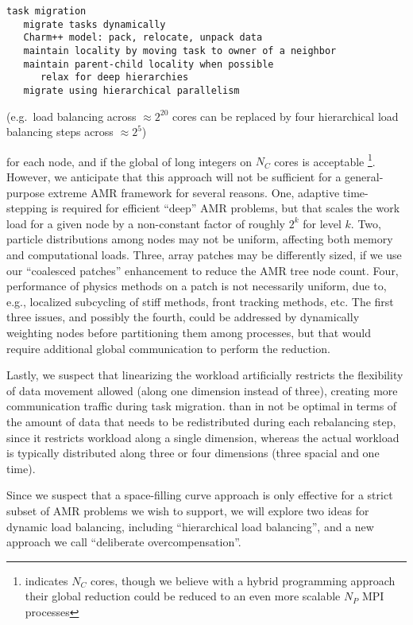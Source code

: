\documentclass{article}
\begin{document}
\begin{verbatim}
task migration
   migrate tasks dynamically
   Charm++ model: pack, relocate, unpack data
   maintain locality by moving task to owner of a neighbor
   maintain parent-child locality when possible
      relax for deep hierarchies
   migrate using hierarchical parallelism
\end{verbatim}

(e.g.~load balancing
across $\approx 2^20$ cores can be replaced by four hierarchical
load balancing steps across $\approx 2^5$)


for each node, and if the global  of long
integers on $N_C$ cores is acceptable \footnote{\cite{BuGh08}
  indicates $N_C$ cores, though we believe with a hybrid programming
  approach their global reduction could be reduced to an even more
  scalable $N_P$ MPI processes}.  However, we anticipate that this
approach will not be sufficient for a general-purpose extreme AMR
framework for several reasons.
%
One, adaptive time-stepping is required for efficient ``deep'' AMR
problems, but that scales the work load for a given node by a
non-constant factor of roughly $2^k$ for level $k$.
%
Two, particle distributions among nodes may not be uniform, affecting both memory and computational loads.
%
Three, array patches may be differently sized, if we use our ``coalesced patches'' enhancement to reduce the AMR tree node count.  
%
Four, performance of physics methods on a patch is not necessarily
uniform, due to, e.g., localized subcycling of stiff methods, front
tracking methods, etc.  The first three issues, and possibly the
fourth, could be addressed by dynamically weighting nodes before
partitioning them among processes, but that would require additional
global communication to perform the reduction.
%

Lastly, we suspect that linearizing the workload artificially
restricts the flexibility of data movement allowed (along one
dimension instead of three), creating more communication traffic
during task migration.  than in not be optimal in terms of the amount
of data that needs to be redistributed during each rebalancing step,
since it restricts workload along a single dimension, whereas the
actual workload is typically distributed along three or four
dimensions (three spacial and one time).

Since we suspect that a space-filling curve approach is only effective
for a strict subset of AMR problems we wish to support, we will
explore two ideas for dynamic load balancing, including ``hierarchical
load balancing'', and a new approach we call ``deliberate
overcompensation''.
\end{document}
